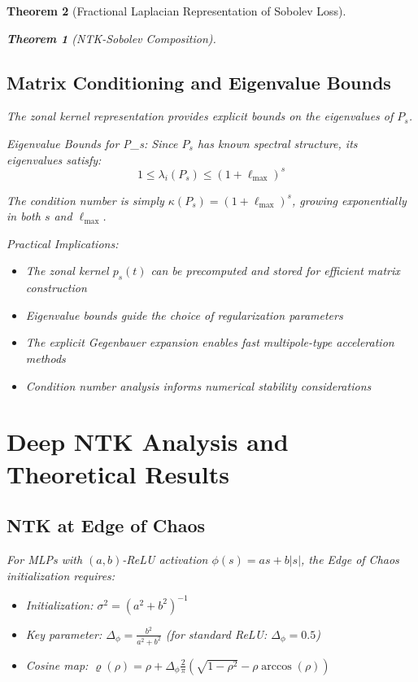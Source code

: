\documentclass{article}
\newtheorem{theorem}{Theorem}[section]
\begin{document}
\begin{theorem}[Fractional Laplacian Representation of Sobolev Loss]
\begin{theorem}[NTK-Sobolev Composition]
\subsection{Matrix Conditioning and Eigenvalue Bounds}

The zonal kernel representation provides explicit bounds on the eigenvalues of $P_s$.

Eigenvalue Bounds for P_s: Since $P_s$ has known spectral structure, its eigenvalues satisfy:
\[ 1 \leq \lambda_i(P_s) \leq (1 + \ell_{\max})^s \]

The condition number is simply $\kappa(P_s) = (1 + \ell_{\max})^s$, growing exponentially in both $s$ and $\ell_{\max}$.

Practical Implications:
\begin{itemize}
\item The zonal kernel $p_s(t)$ can be precomputed and stored for efficient matrix construction
\item Eigenvalue bounds guide the choice of regularization parameters
\item The explicit Gegenbauer expansion enables fast multipole-type acceleration methods
\item Condition number analysis informs numerical stability considerations
\end{itemize}


\newpage



\section{Deep NTK Analysis and Theoretical Results}


\subsection{NTK at Edge of Chaos}

For MLPs with $(a,b)$-ReLU activation $\phi(s) = as + b|s|$, the Edge of Chaos initialization requires:
\begin{itemize}
\item Initialization: $\sigma^2 = (a^2+b^2)^{-1}$
\item Key parameter: $\Delta_\phi = \frac{b^2}{a^2+b^2}$ (for standard ReLU: $\Delta_\phi = 0.5$)
\item Cosine map: $\varrho(\rho) = \rho + \Delta_\phi \frac{2}{\pi}\left( \sqrt{1-\rho^2} - \rho \arccos(\rho) \right)$
\end{itemize}


\end{theorem}
\end{theorem}
\end{document}
